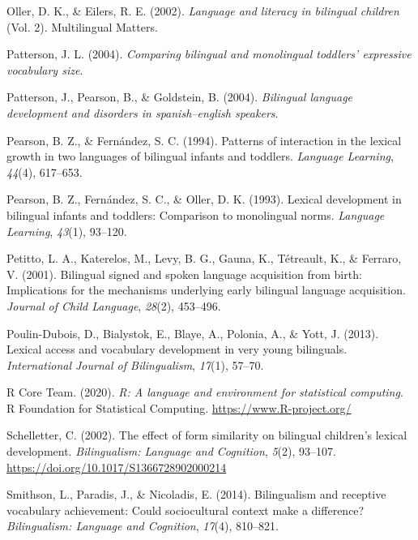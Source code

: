 \documentclass[
  letterpaper,
  DIV=11,
  numbers=noendperiod]{scrartcl}
\newlength{\cslhangindent}
\newlength{\cslentryspacingunit} %
\newenvironment{CSLReferences}[2] %
 {%
  \setlength{\parindent}{0pt}
  \ifodd #1
  \let\oldpar\par
  \def\par{\hangindent=\cslhangindent\oldpar}
  \fi
  \setlength{\parskip}{#2\cslentryspacingunit}
 }%
 {}
\begin{document}
\begin{CSLReferences}{1}{0}
\leavevmode{}%
Oller, D. K., \& Eilers, R. E. (2002). \emph{Language and literacy in
bilingual children} (Vol. 2). Multilingual Matters.

\leavevmode{}%
Patterson, J. L. (2004). \emph{Comparing bilingual and monolingual
toddlers' expressive vocabulary size}.

\leavevmode{}%
Patterson, J., Pearson, B., \& Goldstein, B. (2004). \emph{Bilingual
language development and disorders in spanish--english speakers}.

\leavevmode{}%
Pearson, B. Z., \& Fernández, S. C. (1994). Patterns of interaction in
the lexical growth in two languages of bilingual infants and toddlers.
\emph{Language Learning}, \emph{44}(4), 617--653.

\leavevmode{}%
Pearson, B. Z., Fernández, S. C., \& Oller, D. K. (1993). Lexical
development in bilingual infants and toddlers: Comparison to monolingual
norms. \emph{Language Learning}, \emph{43}(1), 93--120.

\leavevmode{}%
Petitto, L. A., Katerelos, M., Levy, B. G., Gauna, K., Tétreault, K., \&
Ferraro, V. (2001). Bilingual signed and spoken language acquisition
from birth: Implications for the mechanisms underlying early bilingual
language acquisition. \emph{Journal of Child Language}, \emph{28}(2),
453--496.

\leavevmode{}%
Poulin-Dubois, D., Bialystok, E., Blaye, A., Polonia, A., \& Yott, J.
(2013). Lexical access and vocabulary development in very young
bilinguals. \emph{International Journal of Bilingualism}, \emph{17}(1),
57--70.

\leavevmode{}%
R Core Team. (2020). \emph{R: A language and environment for statistical
computing}. R Foundation for Statistical Computing.
\url{https://www.R-project.org/}

\leavevmode{}%
Schelletter, C. (2002). The effect of form similarity on bilingual
children's lexical development. \emph{Bilingualism: Language and
Cognition}, \emph{5}(2), 93--107.
\url{https://doi.org/10.1017/S1366728902000214}

\leavevmode{}%
Smithson, L., Paradis, J., \& Nicoladis, E. (2014). Bilingualism and
receptive vocabulary achievement: Could sociocultural context make a
difference? \emph{Bilingualism: Language and Cognition}, \emph{17}(4),
810--821.


\end{CSLReferences}
\end{document}

